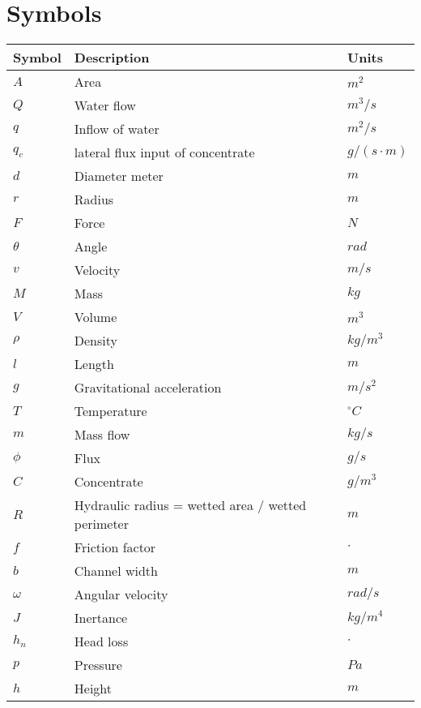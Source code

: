 \section*{Symbols}
\begin{longtable}[H]{p{80pt} p{280pt} p{50pt}} 
\textbf{Symbol}	& \textbf{Description} & \textbf{Units}  \\ \hline
$A$ 	& Area 				& $m^2$ \\ 
$Q$	 	& Water flow 		& $m^3/s$ \\
$q$	 	& Inflow of water 	& $m^2/s$ \\
$q_c$ 	& lateral flux input of concentrate & $g/(s\cdot m)$ \\
$d$ 	& Diameter meter 	& $m$ \\ 
$r$ 	& Radius 			& $m$ \\ 
$F$ 	& Force 			& $N$ \\ 
$\theta$ & Angle 			& $rad$ \\ 
$v$ 	& Velocity 			& $m/s$ \\ 
$M$ 	& Mass 				& $kg$ \\
$V$ 	& Volume 			& $m^3$ \\
$\rho$ 	& Density 			& $kg/m^3$ \\
$l$ 	& Length		 	& $m$ \\
$g$ 	& Gravitational acceleration & $m/s^2$ \\
$T$ 	& Temperature 		& $^{\circ}C$ \\
$m$ 	& Mass flow 		& $kg/s$ \\
$\phi$ 	& Flux 				& $g/s$ \\
$C$ 	& Concentrate 		& $g/m^3$ \\
$R$ 	& Hydraulic radius = wetted area / wetted perimeter & $m$ \\
$f$ 	& Friction factor 	& $\cdot$ \\
$b$ 	& Channel width 	& $m$ \\
$\omega$& Angular velocity	& $rad/s$ \\
$J$		& Inertance			& $kg/m^4$ \\
$h_n$	& Head loss			& $\cdot$ \\
$p$		& Pressure			& $Pa$ \\
$h$		& Height			& $m$ \\
\end{longtable}


